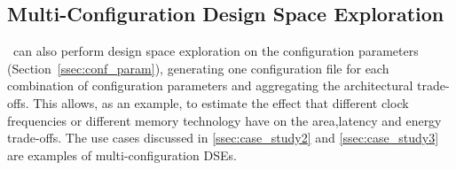 \subsection{Multi-Configuration Design Space Exploration}
\label{ssec:multiconf_dse}
\frameworkname~can also perform design space exploration on the configuration parameters (Section~\ref{ssec:conf_param}), generating one configuration file for each combination of configuration parameters and aggregating the architectural trade-offs. This allows, as an example, to estimate the effect that different clock frequencies or different memory technology have on the area,latency and energy trade-offs. The use cases discussed in \ref{ssec:case_study2} and \ref{ssec:case_study3} are examples of multi-configuration DSEs.
%
%
